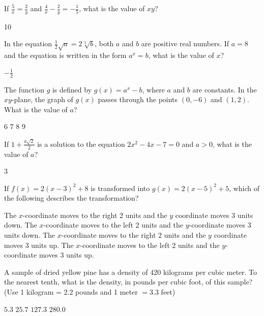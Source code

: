 \question[1]
If $\frac{5}{x}=\frac{2}{y}$ and $\frac{4}{x}-\frac{2}{y}=-\frac{1}{5}$, what is the value of $xy$?
\begin{solution}
10
\end{solution}

\question[1]
In the equation $\frac{1}{2} \sqrt{a}=2 \sqrt[3]{b}$, both $a$ and $b$ are positive real numbers. If $a=8$ and the equation is written in the form $a^x=b$, what is the value of $x$?
\begin{solution}
$-\frac{1}{2}$
\end{solution}




\newpage




\question[1]
The function $g$ is defined by $g(x)=a^x-b$, where $a$ and $b$ are constants. In the $xy$-plane, the graph of $g(x)$ passes through the points $(0,-6)$ and $(1,2)$. What is the value of $a$?
\begin{choices}
  \choice $6$
  \choice $7$
  \choice $8$
  \CorrectChoice $9$
\end{choices}

\question[1]
If $1+\frac{a \sqrt{2}}{2}$ is a solution to the equation $2x^2-4x-7=0$ and $a>0$, what is the value of $a$?
\begin{solution}
3
\end{solution}

\question[1]
If $f(x)=2(x-3)^2+8$ is transformed into $g(x)=2(x-5)^2+5$, which of the following describes the transformation?
\begin{choices}
  \CorrectChoice The $x$-coordinate moves to the right 2 units and the $y$ coordinate moves 3 units down.
  \choice The $x$-coordinate moves to the left 2 units and the $y$-coordinate moves 3 units down.
  \choice The $x$-coordinate moves to the right 2 units and the $y$ coordinate moves 3 units up.
  \choice The $x$-coordinate moves to the left 2 units and the $y$-coordinate moves 3 units up.
\end{choices}




\newpage




\question[1]
A sample of dried yellow pine has a density of 420 kilograms per cubic meter. To the nearest tenth, what is the density, in pounds per cubic foot, of this sample? (Use 1 kilogram = 2.2 pounds and 1 meter $=3.3$ feet)
\begin{choices}
  \choice $5.3$
  \CorrectChoice $25.7$
  \choice $127.3$
  \choice $280.0$
\end{choices}


